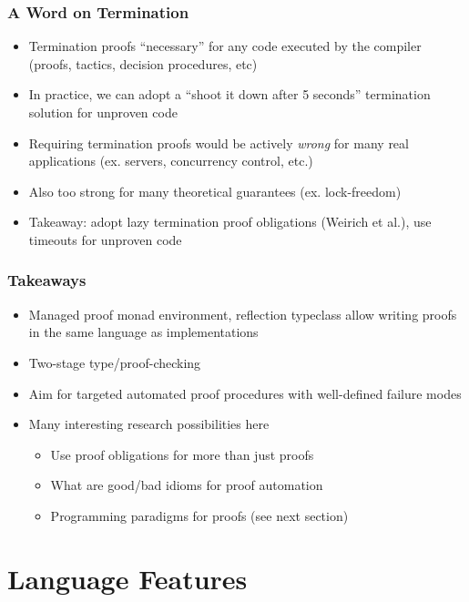 \documentclass{beamer}
\begin{document}
\begin{frame}
  \frametitle{A Word on Termination}
  \begin{itemize}
    \item Termination proofs ``necessary'' for any code executed by
      the compiler (proofs, tactics, decision procedures, etc)
    \item In practice, we can adopt a ``shoot it down after 5
      seconds'' termination solution for unproven code
    \item Requiring termination proofs would be actively \emph{wrong}
      for many real applications (ex. servers, concurrency control, etc.)
    \item Also too strong for many theoretical guarantees (ex. lock-freedom)
    \item Takeaway: adopt lazy termination proof obligations (Weirich
      et al.), use timeouts for unproven code
  \end{itemize}
\end{frame}

\begin{frame}
  \frametitle{Takeaways}
  \begin{itemize}
    \item Managed proof monad environment, reflection typeclass allow
      writing proofs in the same language as implementations
    \item Two-stage type/proof-checking
    \item Aim for targeted automated proof procedures with
      well-defined failure modes
    \item Many interesting research possibilities here
      \begin{itemize}
        \item Use proof obligations for more than just proofs
        \item What are good/bad idioms for proof automation
        \item Programming paradigms for proofs (see next section)
      \end{itemize}
  \end{itemize}
\end{frame}

\section{Language Features}
\end{document}
